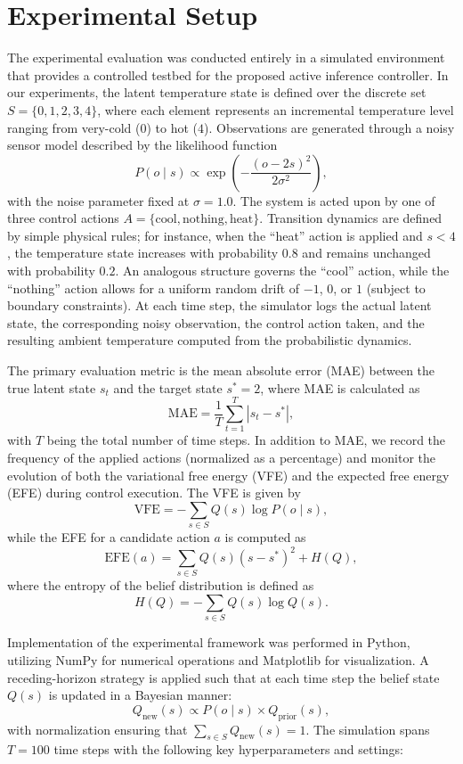 \documentclass[11pt]{article}
\begin{document}
\section{Experimental Setup}
The experimental evaluation was conducted entirely in a simulated environment that provides a controlled testbed for the proposed active inference controller. In our experiments, the latent temperature state is defined over the discrete set \( S = \{0,1,2,3,4\} \), where each element represents an incremental temperature level ranging from very-cold (\(0\)) to hot (\(4\)). Observations are generated through a noisy sensor model described by the likelihood function 
\[
P(o\mid s) \propto \exp\left(-\frac{(o-2s)^2}{2\sigma^2}\right),
\]
with the noise parameter fixed at \(\sigma = 1.0\). The system is acted upon by one of three control actions \( A = \{\text{cool}, \text{nothing}, \text{heat}\} \). Transition dynamics are defined by simple physical rules; for instance, when the “heat” action is applied and \( s < 4 \), the temperature state increases with probability \(0.8\) and remains unchanged with probability \(0.2\). An analogous structure governs the “cool” action, while the “nothing” action allows for a uniform random drift of \(-1\), \(0\), or \(1\) (subject to boundary constraints). At each time step, the simulator logs the actual latent state, the corresponding noisy observation, the control action taken, and the resulting ambient temperature computed from the probabilistic dynamics.

The primary evaluation metric is the mean absolute error (MAE) between the true latent state \( s_t \) and the target state \( s^* = 2 \), where MAE is calculated as
\[
\text{MAE} = \frac{1}{T}\sum_{t=1}^{T} \left| s_t - s^* \right|,
\]
with \( T \) being the total number of time steps. In addition to MAE, we record the frequency of the applied actions (normalized as a percentage) and monitor the evolution of both the variational free energy (VFE) and the expected free energy (EFE) during control execution. The VFE is given by
\[
\text{VFE} = -\sum_{s \in S} Q(s) \log P(o \mid s),
\]
while the EFE for a candidate action \( a \) is computed as
\[
\text{EFE}(a)=\sum_{s \in S} Q(s)(s-s^*)^2 + H(Q),
\]
where the entropy of the belief distribution is defined as 
\[
H(Q) = -\sum_{s \in S} Q(s) \log Q(s).
\]

Implementation of the experimental framework was performed in Python, utilizing NumPy for numerical operations and Matplotlib for visualization. A receding-horizon strategy is applied such that at each time step the belief state \( Q(s) \) is updated in a Bayesian manner:
\[
Q_{\text{new}}(s) \propto P(o\mid s) \times Q_{\text{prior}}(s),
\]
with normalization ensuring that \(\sum_{s \in S} Q_{\text{new}}(s) = 1\). The simulation spans \( T = 100 \) time steps with the following key hyperparameters and settings:
\end{document}
